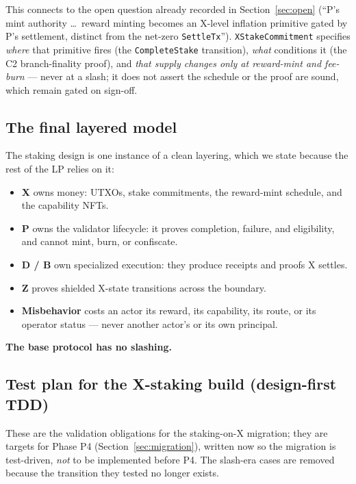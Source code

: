 \noindent This connects to the open question already recorded in
Section~\ref{sec:open} (``P's mint authority \ldots\ reward minting
becomes an X-level inflation primitive gated by P's settlement, distinct
from the net-zero \texttt{SettleTx}''). \texttt{XStakeCommitment}
specifies \emph{where} that primitive fires (the \texttt{CompleteStake}
transition), \emph{what} conditions it (the C2 branch-finality proof), and
\emph{that supply changes only at reward-mint and fee-burn} --- never at a
slash; it does not assert the schedule or the proof are sound, which
remain gated on sign-off.

\subsection{The final layered model}
\label{sec:stake-layers}

The staking design is one instance of a clean layering, which we state
because the rest of the LP relies on it:

\begin{itemize}[leftmargin=2em,nosep]
\item \textbf{X} owns money: UTXOs, stake commitments, the reward-mint
  schedule, and the capability NFTs.
\item \textbf{P} owns the validator lifecycle: it proves completion,
  failure, and eligibility, and cannot mint, burn, or confiscate.
\item \textbf{D / B} own specialized execution: they produce receipts and
  proofs X settles.
\item \textbf{Z} proves shielded X-state transitions across the boundary.
\item \textbf{Misbehavior} costs an actor its reward, its capability, its
  route, or its operator status --- never another actor's or its own
  principal.
\end{itemize}
\noindent \textbf{The base protocol has no slashing.}

\subsection{Test plan for the X-staking build (design-first TDD)}
\label{sec:stake-tests}

These are the validation obligations for the staking-on-X migration; they
are \DESIGN{} targets for Phase P4 (Section~\ref{sec:migration}), written
now so the migration is test-driven, \emph{not} to be implemented before
P4. The slash-era cases are removed because the transition they tested no
longer exists.

